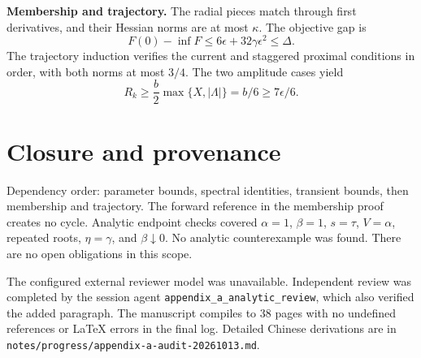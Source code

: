 \documentclass[10pt]{article}
\begin{document}
\textbf{Membership and trajectory.} The radial pieces match through first
derivatives, and their Hessian norms are at most $\kappa$. The objective gap is
\[
F(0)-\inf F\le6\epsilon+32\gamma\epsilon^2\le\Delta.
\]
The trajectory induction verifies the current and staggered proximal conditions
in order, with both norms at most $3/4$. The two amplitude cases yield
\[
R_k\ge\frac b2\max\{X,|\Lambda|\}=b/6\ge7\epsilon/6.
\]

\section*{Closure and provenance}
Dependency order: parameter bounds, spectral identities, transient bounds,
then membership and trajectory. The forward reference in the membership proof
creates no cycle. Analytic endpoint checks covered $\alpha=1$, $\beta=1$,
$s=\tau$, $V=\alpha$, repeated roots, $\eta=\gamma$, and $\beta\downarrow0$.
No analytic counterexample was found. There are no open obligations in this scope.

The configured external reviewer model was unavailable. Independent review was
completed by the session agent \texttt{appendix\_a\_analytic\_review}, which also
verified the added paragraph. The manuscript compiles to 38 pages with no
undefined references or LaTeX errors in the final log. Detailed Chinese
derivations are in \texttt{notes/progress/appendix-a-audit-20261013.md}.
\end{document}
